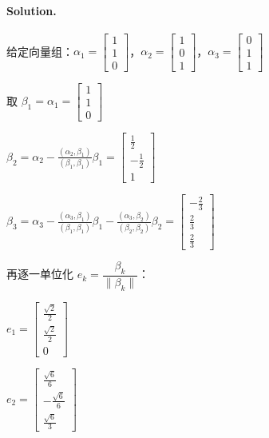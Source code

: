 \documentclass[12pt, a4paper]{article}
\newcommand{\solution}{\paragraph{Solution.}}
\begin{document}
\solution


给定向量组：$\alpha_{1} = \left[\begin{matrix}1\\1\\0\end{matrix}\right]$，$\alpha_{2} = \left[\begin{matrix}1\\0\\1\end{matrix}\right]$，$\alpha_{3} = \left[\begin{matrix}0\\1\\1\end{matrix}\right]$

取 $\beta_1 = \alpha_1 = \left[\begin{matrix}1\\1\\0\end{matrix}\right]$

$\beta_{2} = \alpha_{2} - \frac{(\alpha_{2},\beta_{1})}{(\beta_{1},\beta_{1})}\beta_{1}= \left[\begin{matrix}\frac{1}{2}\\- \frac{1}{2}\\1\end{matrix}\right]$

$\beta_{3} = \alpha_{3} - \frac{(\alpha_{3},\beta_{1})}{(\beta_{1},\beta_{1})}\beta_{1} - \frac{(\alpha_{3},\beta_{2})}{(\beta_{2},\beta_{2})}\beta_{2}= \left[\begin{matrix}- \frac{2}{3}\\\frac{2}{3}\\\frac{2}{3}\end{matrix}\right]$

再逐一单位化 $e_k = \dfrac{\beta_k}{\|\beta_k\|}$：

$e_{1} = \left[\begin{matrix}\frac{\sqrt{2}}{2}\\\frac{\sqrt{2}}{2}\\0\end{matrix}\right]$

$e_{2} = \left[\begin{matrix}\frac{\sqrt{6}}{6}\\- \frac{\sqrt{6}}{6}\\\frac{\sqrt{6}}{3}\end{matrix}\right]$
\end{document}
